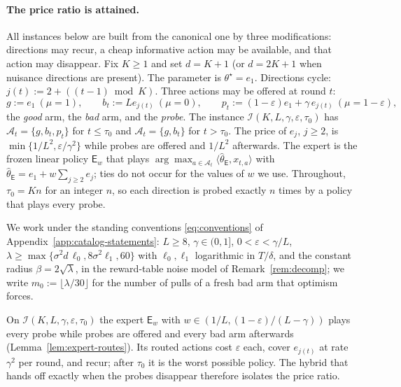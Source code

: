 \documentclass{article}
\theoremstyle{definition}
\theoremstyle{remark}
\newcommand{\eps}{\varepsilon}
\theoremstyle{remark}
\newcommand{\Exp}{\mathsf{E}}
\begin{document}
\paragraph{The price ratio is attained.}
All instances below are built from the canonical one by three modifications:
directions may recur, a cheap informative action may be available, and that
action may disappear. Fix $K\ge1$ and set $d=K+1$ (or $d=2K+1$ when nuisance
directions are present). The parameter is $\theta^\star=e_1$. Directions
cycle: $j(t):=2+((t-1)\bmod K)$. Three actions may be offered at round $t$:
\[
g:=e_1\ (\mu=1),\qquad
b_t:=Le_{j(t)}\ (\mu=0),\qquad
p_t:=(1-\eps)e_1+\gamma\,e_{j(t)}\ (\mu=1-\eps),
\]
the \emph{good} arm, the \emph{bad} arm, and the \emph{probe}. The instance
$\mathcal I(K,L,\gamma,\eps,\tau_0)$ has $\mathcal A_t=\{g,b_t,p_t\}$ for $t\le\tau_0$
and $\mathcal A_t=\{g,b_t\}$ for $t>\tau_0$. The price of $e_j$, $j\ge2$, is
$\min\{1/L^2,\eps/\gamma^2\}$ while probes are offered and $1/L^2$ afterwards. The
expert is the frozen linear policy $\Exp_w$ that plays
$\arg\max_{a\in\mathcal A_t}\langle\widehat\theta_{\Exp},x_{t,a}\rangle$ with
$\widehat\theta_{\Exp}=e_1+w\sum_{j\ge2}e_j$; ties do not occur for the values
of $w$ we use. Throughout, $\tau_0=Kn$ for an integer $n$, so each direction is
probed exactly $n$ times by a policy that plays every probe.

We work under the standing conventions \eqref{eq:conventions} of
Appendix~\ref{app:catalog-statements}: $L\ge8$, $\gamma\in(0,1]$, $0<\eps<\gamma/L$,
$\lambda\ge\max\{\sigma^2d\,\ell_0,8\sigma^2\ell_1,60\}$ with $\ell_0,\ell_1$
logarithmic in $T/\delta$, and the constant radius $\beta=2\sqrt\lambda$, in
the reward-table noise model of Remark~\ref{rem:decomp}; we write
$m_0:=\lfloor\lambda/30\rfloor$ for the number of pulls of a fresh bad arm
that optimism forces.

On $\mathcal I(K,L,\gamma,\eps,\tau_0)$ the expert $\Exp_w$ with
$w\in(1/L,(1-\eps)/(L-\gamma))$ plays every probe while probes are offered and
every bad arm afterwards (Lemma~\ref{lem:expert-routes}). Its routed actions
cost $\eps$ each, cover $e_{j(t)}$ at rate $\gamma^2$ per round, and recur; after
$\tau_0$ it is the worst possible policy. The hybrid that hands off exactly
when the probes disappear therefore isolates the price ratio.
\end{document}
